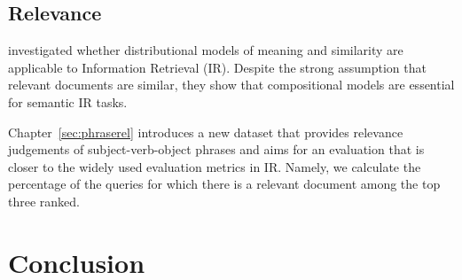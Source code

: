 \subsection{Relevance}
\label{sec:relevance}

 investigated whether distributional
models of meaning and similarity are applicable to Information Retrieval (IR). Despite the strong assumption that relevant documents are similar, they show that compositional models are essential for semantic IR tasks.

Chapter~\ref{sec:phraserel} introduces a new dataset that provides relevance judgements of subject-verb-object phrases and aims for an evaluation that is closer to the widely used evaluation metrics in IR. Namely, we calculate the percentage of the queries for which there is a relevant document among the top three ranked.

\section{Conclusion}
\label{sec:conclusion-comp}



